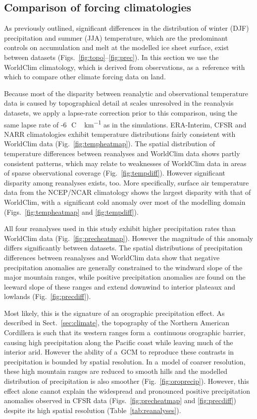 \documentclass[tc, ms]{copernicus}
\begin{document}
\subsection{Comparison of forcing climatologies}

As previously outlined, significant differences in the distribution of winter (DJF) precipitation and summer (JJA) temperature, which are the predominant controls on accumulation and melt at the modelled ice sheet surface, exist between datasets (Figs.~\ref{fig:topo}--\ref{fig:prec}). In this section we use the WorldClim climatology, which is derived from observations, as a~reference with which to compare other climate forcing data on land.

Because most of the disparity between reanalytic and observational temperature data is caused by topographical detail at scales unresolved in the reanalysis datasets, we apply a lapse-rate correction prior to this comparison, using the same lapse rate of -6\,\unit{{\degree}C\,km^{-1}} as in the simulations. ERA-Interim, CFSR and NARR climatologies exhibit temperature distributions fairly consistent with WorldClim data (Fig.~\ref{fig:tempheatmap}). The spatial distribution of temperature differences between reanalyses and WorldClim data shows partly consistent patterns, which may relate to weaknesses of WorldClim data in areas of sparse observational coverage (Fig.~\ref{fig:tempdiff}). However significant disparity among reanalyses exists, too. More specifically, surface air temperature data from the NCEP/NCAR climatology shows the largest disparity with that of WorldClim, with a~significant cold anomaly over most of the modelling domain (Figs.~\ref{fig:tempheatmap} and \ref{fig:tempdiff}).

All four reanalyses used in this study exhibit higher precipitation rates than WorldClim data (Fig.~\ref{fig:precheatmap}). However the magnitude of this anomaly differs significantly between datasets. The spatial distributions of precipitation differences between reanalyses and WorldClim data show that negative precipitation anomalies are generally constrained to the windward slope of the major mountain ranges, while positive precipitation anomalies are found on the leeward slope of these ranges and extend downwind to interior plateaux and lowlands (Fig.~\ref{fig:precdiff}).

Most likely, this is the signature of an orographic precipitation effect. As described in Sect.~\ref{sec:climate}, the topography of the Northern American Cordillera is such that its western ranges form a~continuous orographic barrier, causing high precipitation along the Pacific coast while leaving much of the interior arid. However the ability of a~GCM to reproduce these contrasts in precipitation is bounded by spatial resolution. In a~model of coarser resolution, these high mountain ranges are reduced to smooth hills and the modelled distribution of precipitation is also smoother (Fig.~\ref{fig:oroprecip}). However, this effect alone cannot explain the widespread and pronounced positive precipitation anomalies observed in CFSR data (Figs.~\ref{fig:precheatmap} and \ref{fig:precdiff}) despite its high spatial resolution (Table~\ref{tab:reanalyses}).
\end{document}

